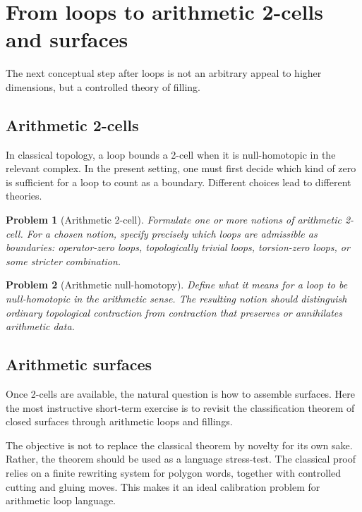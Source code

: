 \documentclass[11pt]{article}
\newtheorem{problem}{Problem}[section]
\begin{document}
\section{From loops to arithmetic 2-cells and surfaces}

The next conceptual step after loops is not an arbitrary appeal to higher dimensions, but a controlled theory of filling.

\subsection{Arithmetic 2-cells}

In classical topology, a loop bounds a 2-cell when it is null-homotopic in the relevant complex. In the present setting, one must first decide which kind of zero is sufficient for a loop to count as a boundary. Different choices lead to different theories.

\begin{problem}[Arithmetic 2-cell]
Formulate one or more notions of arithmetic 2-cell. For a chosen notion, specify precisely which loops are admissible as boundaries: operator-zero loops, topologically trivial loops, torsion-zero loops, or some stricter combination.
\end{problem}

\begin{problem}[Arithmetic null-homotopy]
Define what it means for a loop to be null-homotopic in the arithmetic sense. The resulting notion should distinguish ordinary topological contraction from contraction that preserves or annihilates arithmetic data.
\end{problem}

\subsection{Arithmetic surfaces}

Once 2-cells are available, the natural question is how to assemble surfaces. Here the most instructive short-term exercise is to revisit the classification theorem of closed surfaces through arithmetic loops and fillings.

The objective is not to replace the classical theorem by novelty for its own sake. Rather, the theorem should be used as a language stress-test. The classical proof relies on a finite rewriting system for polygon words, together with controlled cutting and gluing moves. This makes it an ideal calibration problem for arithmetic loop language.
\end{document}
